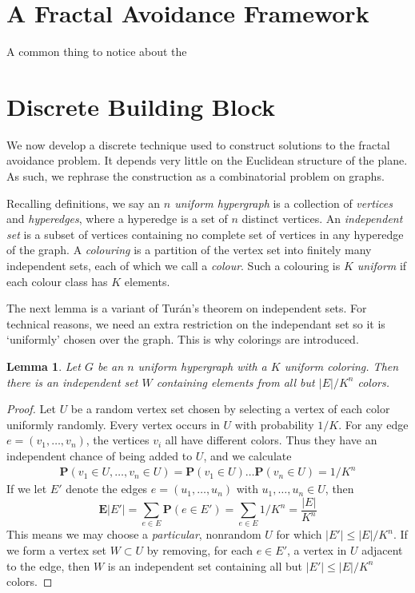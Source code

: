 \documentclass{article}
\theoremstyle{plain}
\newtheorem{lemma}{Lemma}
\theoremstyle{plain}
\begin{document}
\begin{multicols}{2}
\section{A Fractal Avoidance Framework}

A common thing to notice about the 

\section{Discrete Building Block}

We now develop a discrete technique used to construct solutions to the fractal avoidance problem. It depends very little on the Euclidean structure of the plane. As such, we rephrase the construction as a combinatorial problem on graphs.

Recalling definitions, we say an {\it $n$ uniform hypergraph} is a collection of {\it vertices} and {\it hyperedges}, where a hyperedge is a set of $n$ distinct vertices. An {\it independent set} is a subset of vertices containing no complete set of vertices in any hyperedge of the graph. A {\it colouring} is a partition of the vertex set into finitely many independent sets, each of which we call a {\it colour}. Such a colouring is {\it $K$ uniform} if each colour class has $K$ elements.

The next lemma is a variant of Tur\'{a}n's theorem on independent sets. For technical reasons, we need an extra restriction on the independant set so it is `uniformly' chosen over the graph. This is why colorings are introduced.

\begin{lemma}
	Let $G$ be an $n$ uniform hypergraph with a $K$ uniform coloring. Then there is an independent set $W$ containing elements from all but $|E|/K^n$ colors.
\end{lemma}
\begin{proof}
	Let $U$ be a random vertex set chosen by selecting a vertex of each color uniformly randomly. Every vertex occurs in $U$ with probability $1/K$. For any edge $e = (v_1, \dots, v_n)$, the vertices $v_i$ all have different colors. Thus they have an independent chance of being added to $U$, and we calculate
	\begin{align*}
		\mathbf{P}(v_1 \in U, \dots, v_n \in U) = \mathbf{P}(v_1 \in U) \dots \mathbf{P}(v_n \in U) = 1/K^n
	\end{align*}
	If we let $E'$ denote the edges $e = (u_1, \dots, u_n)$ with $u_1, \dots, u_n \in U$, then
	\[ \mathbf{E}|E'| = \sum_{e \in E} \mathbf{P}(e \in E') = \sum_{e \in E} 1/K^n = \frac{|E|}{K^n} \]
	This means we may choose a {\it particular}, nonrandom $U$ for which $|E'| \leq |E|/K^n$. If we form a vertex set $W \subset U$ by removing, for each $e \in E'$, a vertex in $U$ adjacent to the edge, then $W$ is an independent set containing all but $|E'| \leq |E|/K^n$ colors.
\end{proof}


\end{multicols}
\end{document}
